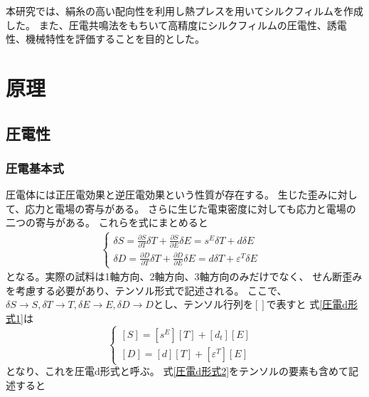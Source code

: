 \documentclass[dvipdfmx,12pt,a4paper]{jreport}
\begin{document}
		本研究では、絹糸の高い配向性を利用し熱プレスを用いてシルクフィルムを作成した。
		また、圧電共鳴法をもちいて高精度にシルクフィルムの圧電性、誘電性、機械特性を評価することを目的とした。
	\chapter{原理}
		\section{圧電性}
		\subsection{圧電基本式}
		圧電体には正圧電効果と逆圧電効果という性質が存在する。
		生じた歪みに対して、応力と電場の寄与がある。
		さらに生じた電束密度に対しても応力と電場の二つの寄与がある。
		これらを式にまとめると
				\begin{eqnarray}
					\begin{cases}
						\delta S=\frac{\partial S}{\partial T}\delta T + \frac{\partial S}{\partial E} \delta E 
						= s^{E}\delta T+d \delta E & \\
						\delta D=\frac{\partial D}{\partial T}\delta T + \frac{\partial D}{\partial E}\delta E 
						= d \delta T+\varepsilon^T \delta E  &
					\end{cases}
					\label{圧電d形式1}
				\end{eqnarray}
			となる。実際の試料は1軸方向、2軸方向、3軸方向のみだけでなく、
			せん断歪みを考慮する必要があり、テンソル形式で記述される。
			ここで、$\delta S\rightarrow S, \delta T\rightarrow T,
			\delta E\rightarrow E, \delta D\rightarrow D$とし、テンソル行列を$\left[　\right]$で表すと
			式\ref{圧電d形式1}は
			\begin{equation}
				\begin{cases}
					\left[S\right]=\left[s^E\right]\left[T\right]+\left[d_t\right]\left[E\right]& \\
					\left[D\right]=\left[d\right]\left[T\right]+\left[\varepsilon^T\right]\left[E\right]
				\end{cases}
				\label{圧電d形式2}
			\end{equation}
			となり、これを圧電d形式と呼ぶ。
			式\ref{圧電d形式2}をテンソルの要素も含めて記述すると
\end{document}

